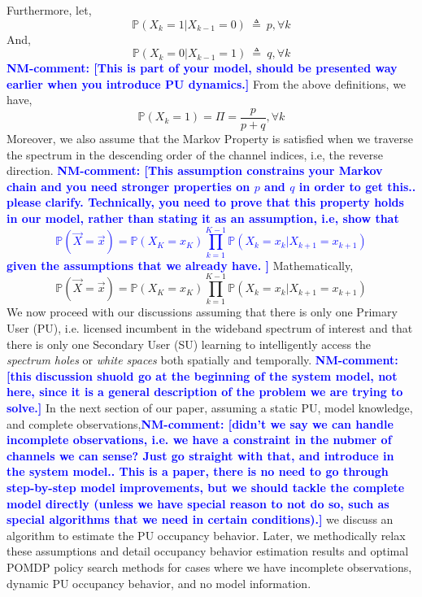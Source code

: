 \documentclass[conference]{IEEEtran}
\newcommand{\nm}[1]{\textcolor{blue}{\textbf{NM-comment: [#1]}}}
\begin{document}
Furthermore, let, 
\begin{equation*}
    \mathbb P(X_k=1|X_{k-1}=0)\ \triangleq\ p, \forall k
\end{equation*}
And,
\begin{equation*}
    \mathbb P(X_k=0|X_{k-1}=1)\ \triangleq\ q, \forall k
\end{equation*}
\nm{This is part of your model, should be presented way earlier when you introduce PU dynamics.}
From the above definitions, we have,
\begin{equation*}
    \mathbb P(X_k=1)=\Pi=\frac{p}{p+q}, \forall k
\end{equation*}
Moreover, we also assume that the Markov Property is satisfied when we traverse the spectrum in the descending order of the channel indices, i.e, the reverse direction. 
\nm{This assumption constrains your Markov chain and you need stronger properties on $p$ and $q$ in order to get this.. please clarify. Technically, you need to prove that this property holds in our model, rather than stating it as an assumption, i.e, show that 
\begin{equation*}
\mathbb P(\vec{X}=\vec{x})=\mathbb P(X_K=x_K)\prod_{k=1}^{K-1} \mathbb P(X_{k}=x_k|X_{k+1}=x_{k+1})
\end{equation*}
given the assumptions that we already have.
}
Mathematically,
\begin{equation*}
\mathbb P(\vec{X}=\vec{x})=\mathbb P(X_K=x_K)\prod_{k=1}^{K-1} \mathbb P(X_{k}=x_k|X_{k+1}=x_{k+1})
\end{equation*}
We now proceed with our discussions assuming that there is only one Primary User (PU), i.e. licensed incumbent in the wideband spectrum of interest and that there is only one Secondary User (SU) learning to intelligently access the \textit{spectrum holes} or \textit{white spaces} both spatially and temporally.
\nm{this discussion shuold go  at the beginning of the system model, not here, since it is a general description of the problem we are trying to solve.}
In the next section of our paper, assuming a static PU, model knowledge, and complete observations,\nm{didn't we say we can handle incomplete observations, i.e. we have a constraint in the nubmer of channels we can sense? Just go straight with that, and introduce in the system model.. This is a paper, there is no need to go through step-by-step model improvements, but we should tackle the complete model directly (unless we have special reason to not do so, such as special algorithms that we need in certain conditions).} we discuss an algorithm to estimate the PU occupancy behavior. Later, we methodically relax these assumptions and detail occupancy behavior estimation results and optimal POMDP policy search methods for cases where we have incomplete observations, dynamic PU occupancy behavior, and no model information.
\end{document}
